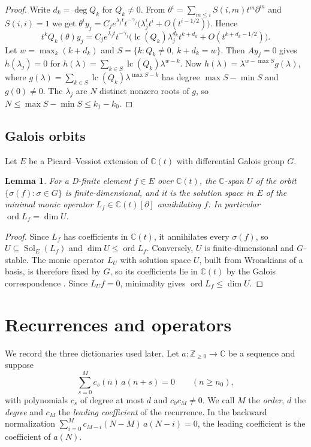 \documentclass[11pt,a4paper]{article}
\newtheorem{lemma}[theorem]{Lemma}
\theoremstyle{definition}
\theoremstyle{remark}
\newcommand{\C}{\mathbb C}
\newcommand{\Z}{\mathbb Z}
\DeclareMathOperator{\ord}{ord}
\DeclareMathOperator{\Sol}{Sol}
\DeclareMathOperator{\lc}{lc}
\numberwithin{equation}{section}
\begin{document}
\begin{proof}
Write $d_k=\deg Q_k$ for $Q_k\ne0$. From $\theta^i=\sum_{m\le i}S(i,m)t^m\partial^m$ and $S(i,i)=1$ we get $\theta^iy_j=C_je^{\lambda_jt}t^{-\gamma_j}\bigl(\lambda_j^it^i+O(t^{i-1/2})\bigr)$. Hence
\[
t^kQ_k(\theta)y_j=C_je^{\lambda_jt}t^{-\gamma_j}\bigl(\lc(Q_k)\lambda_j^{d_k}t^{k+d_k}+O(t^{k+d_k-1/2})\bigr).
\]
Let $w=\max_k(k+d_k)$ and $S=\{k:Q_k\ne0,\ k+d_k=w\}$. Then $Ay_j=0$ gives $h(\lambda_j)=0$ for $h(\lambda)=\sum_{k\in S}\lc(Q_k)\lambda^{w-k}$. Now $h(\lambda)=\lambda^{w-\max S}g(\lambda)$, where $g(\lambda)=\sum_{k\in S}\lc(Q_k)\lambda^{\max S-k}$ has degree $\max S-\min S$ and $g(0)\ne0$. The $\lambda_j$ are $N$ distinct nonzero roots of $g$, so $N\le\max S-\min S\le k_1-k_0$.
\end{proof}

\subsection{Galois orbits}
Let $E$ be a Picard--Vessiot extension of $\C(t)$ with differential Galois group $G$.

\begin{lemma}\label{B:lem:galois-orbit}
For a D-finite element $f\in E$ over $\C(t)$, the $\C$-span $U$ of the orbit $\{\sigma(f):\sigma\in G\}$ is finite-dimensional, and it is the solution space in $E$ of the minimal monic operator $L_f\in\C(t)[\partial]$ annihilating $f$. In particular $\ord L_f=\dim U$.
\end{lemma}

\begin{proof}
Since $L_f$ has coefficients in $\C(t)$, it annihilates every $\sigma(f)$, so $U\subseteq\Sol_E(L_f)$ and $\dim U\le\ord L_f$. Conversely, $U$ is finite-dimensional and $G$-stable. The monic operator $L_U$ with solution space $U$, built from Wronskians of a basis, is therefore fixed by $G$, so its coefficients lie in $\C(t)$ by the Galois correspondence \cite{vdPS03}. Since $L_Uf=0$, minimality gives $\ord L_f\le\dim U$.
\end{proof}

\section{Recurrences and operators}\label{B:sec:dict}

We record the three dictionaries used later. Let $a:\Z_{\ge0}\to\C$ be a sequence and suppose
\begin{equation}\label{B:eq:rec}
\sum_{s=0}^{M}c_s(n)\,a(n+s)=0\qquad(n\ge n_0),
\end{equation}
with polynomials $c_s$ of degree at most $d$ and $c_0c_M\ne0$. We call $M$ the \emph{order}, $d$ the \emph{degree} and $c_M$ the \emph{leading coefficient} of the recurrence. In the backward normalization $\sum_{i=0}^{M}c_{M-i}(N-M)\,a(N-i)=0$, the leading coefficient is the coefficient of $a(N)$.
\end{document}
